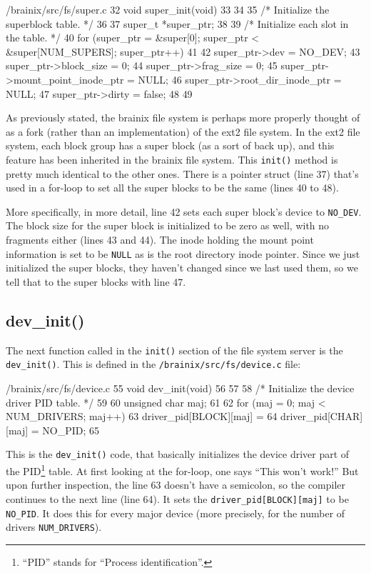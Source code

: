 \documentclass{article}
\begin{document}
\begin{code}{/brainix/src/fs/super.c}
32 void super_init(void)
33{
34
35 /* Initialize the superblock table. */
36
37      super_t *super_ptr;
38
39      /* Initialize each slot in the table. */
40      for (super_ptr = &super[0]; super_ptr < &super[NUM_SUPERS]; super_ptr++)
41      {
42           super_ptr->dev = NO_DEV;
43           super_ptr->block_size = 0;
44           super_ptr->frag_size = 0;
45           super_ptr->mount_point_inode_ptr = NULL;
46           super_ptr->root_dir_inode_ptr = NULL;
47           super_ptr->dirty = false;
48      }
49 }
\end{code}
As previously stated, the brainix file system is perhaps more properly thought of as a fork (rather than an implementation) of the ext2 file system. In the ext2 file system, each block group has a super block (as a sort of back up), and this feature has been inherited in the brainix file system. This \verb|init()| method is pretty much identical to the other ones. There is a pointer struct (line 37) that's used in a for-loop to set all the super blocks to be the same (lines 40 to 48).

More specifically, in more detail, line 42 sets each super block's device to \verb|NO_DEV|. The block size for the super block is initialized to be zero as well, with no fragments either (lines 43 and 44). The inode holding the mount point information is set to be \verb|NULL| as is the root directory inode pointer. Since we just initialized the super blocks, they haven't changed since we last used them, so we tell that to the super blocks with line 47.

\subsection{dev\_init()}

The next function called in the \verb|init()| section of the file system server is the \verb|dev_init()|. This is defined in the \verb|/brainix/src/fs/device.c| file:
\begin{code}{/brainix/src/fs/device.c}
55 void dev_init(void)
56 {
57 
58 /* Initialize the device driver PID table. */
59 
60      unsigned char maj;
61 
62      for (maj = 0; maj < NUM_DRIVERS; maj++) 
63           driver_pid[BLOCK][maj] = 
64           driver_pid[CHAR][maj] = NO_PID;
65 }
\end{code}
This is the \verb|dev_init()| code, that basically initializes the device driver part of the PID\footnote{``PID'' stands for ``Process identification''.} table. At first looking at the for-loop, one says ``This won't work!'' But upon further inspection, the line 63 doesn't have a semicolon, so the compiler continues to the next line (line 64). It sets the \verb|driver_pid[BLOCK][maj]| to be \verb|NO_PID|. It does this for every major device (more precisely, for the number of drivers \verb|NUM_DRIVERS|). 
\end{document}

